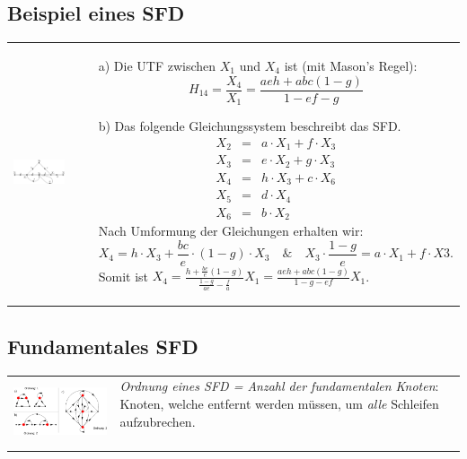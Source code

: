 \subsection{Beispiel eines SFD }
\begin{tabular}{ll}
	\parbox{7cm}{
    	\includegraphics[width=7cm]{./images/sfd-bsp.png}
    }
    
    & \parbox{12cm}{
    \begin{enumerate}
		\item[a)] Die UTF zwischen $X_1$ und $X_4$ ist (mit Mason's Regel):\\
		\begin{equation*}
		H_{14}=\frac{X_4}{X_1}=\frac{aeh+abc(1-g)}{1-ef-g}
		\end{equation*}
		\item[b)] Das folgende Gleichungssystem beschreibt das SFD.
		\begin{eqnarray*}
		X_2 &=&a\cdot X_1+f\cdot X_3\\
		X_3 &=&e\cdot X_2+g\cdot X_3\\
		X_4 &=&h\cdot X_3+c\cdot X_6\\
		X_5 &=&d\cdot X_4\\
		X_6 &=&b\cdot X_2
		\end{eqnarray*}
		Nach Umformung der Gleichungen erhalten wir:
		\begin{equation*}
		X_4=h\cdot X_3+\frac{bc}{e}\cdot (1-g)\cdot X_3\quad\&\quad X_3\cdot
		\frac{1-g}{e}=a\cdot X_1+f\cdot X3.
		\end{equation*}
		Somit ist $X_4=\frac{h+\frac{bc}{e}(1-g)}{\frac{1-g}{ae}-\frac{f}{a}}X_1=\frac{aeh+abc(1-g)}{1-g-ef}X_1$.
	\end{enumerate}}
\end{tabular}

\subsection{Fundamentales SFD }
\begin{tabular}{ll}
	\parbox{7cm}{
    	\includegraphics[width=7cm]{./images/sfd-ordnung.png}
    }
    
    & \parbox{12cm}{
		\textit{Ordnung eines SFD = Anzahl der fundamentalen Knoten}: Knoten, welche
		entfernt werden müssen, um \textit{alle} Schleifen aufzubrechen. \\ \\
	}
\end{tabular}
